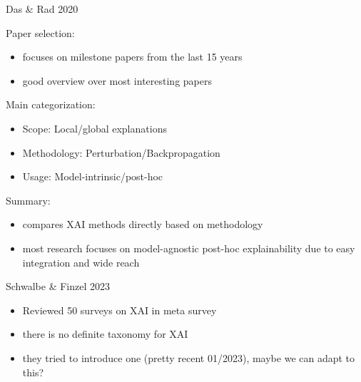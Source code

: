 \documentclass[presentation]{beamer}
\begin{document}
\begin{frame}[label={sec:org8fdd490}]{Das \& Rad 2020}
\begin{block}{Paper selection:}
\begin{itemize}
\item focuses on milestone papers from the last 15 years
\item good overview over most interesting papers
\end{itemize}
\end{block}
\begin{block}{Main categorization:}
\begin{itemize}
\item Scope: Local/global explanations
\item Methodology: Perturbation/Backpropagation
\item Usage: Model-intrinsic/post-hoc
\end{itemize}
\end{block}
\end{frame}
\begin{frame}
\begin{block}{Summary:}
\begin{itemize}
\item compares XAI methods directly based on methodology
\item most research focuses on model-agnostic post-hoc explainability due to easy integration and wide reach
\end{itemize}
\end{block}
\end{frame}

\begin{frame}[label={sec:org7e81ca3}]{Schwalbe \& Finzel 2023}
\begin{itemize}
\item Reviewed 50 surveys on XAI in meta survey
\item there is no definite taxonomy for XAI
\item they tried to introduce one (pretty recent 01/2023), maybe we can adapt to this?
\end{itemize}
\end{frame}
\end{document}
